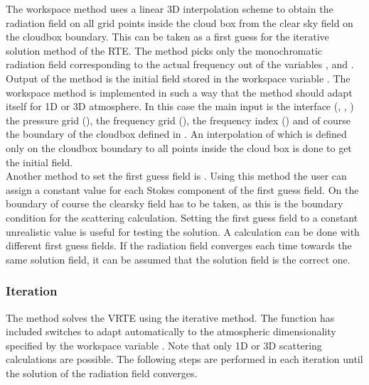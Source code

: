 The workspace method  uses a linear 3D
interpolation scheme to obtain the radiation field on all grid points
inside the cloud box from the clear sky field on the cloudbox
boundary.  This can be taken as a first guess for the iterative
solution method of the RTE.  The method picks only the monochromatic
radiation field corresponding to the actual frequency out of the
variables ,  and
. Output of the method is the initial field
stored in the workspace variable .  The workspace
method  is implemented in such a way
that the method should adapt itself for 1D or 3D atmosphere. In this
case the main input is the interface (,
, ) the pressure grid
(), the frequency grid (), the
frequency index () and of course the
boundary of the cloudbox defined in .  An
interpolation of  which is defined only on the
cloudbox boundary to all points inside the cloud box is
done to get the initial field. \\

\vspace*{1ex} Another method to set the first guess field is
. Using this method the user can assign a
constant value for each Stokes component of the first guess field. On
the boundary of course the clearsky field has to be taken, as this is
the boundary condition for the scattering calculation.  Setting the
first guess field to a constant unrealistic value is useful for
testing the solution. A calculation can be done with different first
guess fields. If the radiation field converges each time towards the
same solution field, it can be assumed that the solution field is the
correct one.


\subsubsection{Iteration}
The method  solves the VRTE using the
iterative method.  The function has included switches to adapt
automatically to the atmospheric dimensionality specified by the
workspace variable . Note that only 1D or 3D
scattering calculations are possible.  The following steps are
performed in each iteration until the solution of the radiation field
converges.

